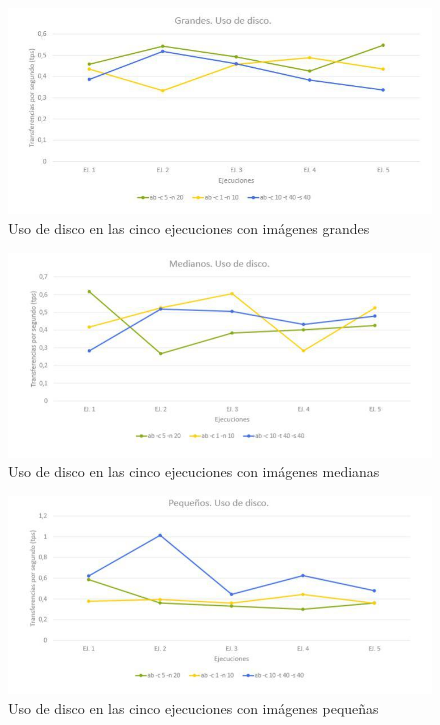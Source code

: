 \documentclass[11pt,twoside,a4paper]{book}
\renewcommand{\baselinestretch}{1.2}
\begin{document}
\begin{figure}
   \includegraphics[width=\textwidth]{grafica2.jpg}
   \caption{Uso de disco en las cinco ejecuciones con imágenes grandes}
   \label{Fig2}
\end{figure}
\begin{figure}
   \includegraphics[width=\textwidth]{grafica3.jpg}
\caption{Uso de disco en las cinco ejecuciones con imágenes medianas}   \label{Fig3}
\end{figure}
\begin{figure}
   \includegraphics[width=\textwidth]{grafica4.jpg}
   \caption{Uso de disco en las cinco ejecuciones con imágenes pequeñas}
   \label{Fig4}
\end{figure}


\appendix

\renewcommand{\baselinestretch}{1.2}



\cite{KM2000}
\end{document}
